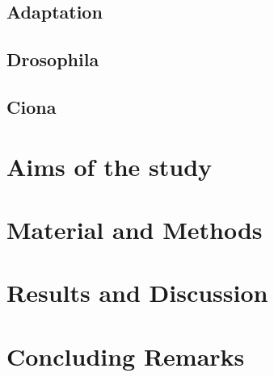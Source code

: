 \documentclass[officiallayout]{tktla_modified}
\begin{document}
	\section{Adaptation}
	
	\clearpage
	\section{Drosophila}
	
	\clearpage
	\section{Ciona}
	
	\clearpage

\chapter{Aims of the study}



\chapter{Material and Methods}



\chapter{Results and Discussion}




\chapter{Concluding Remarks}



\listoffigures

%


\end{document}
